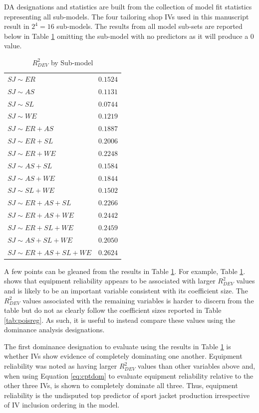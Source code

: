 \documentclass[ShortAfour,times,sageapa]{sagej}
\begin{document}
	DA designations and statistics are built from the collection of model fit statistics representing all sub-models.
	The four tailoring shop IVs used in this manuscript result in $2^4 = 16$ sub-models.
	The results from all model sub-sets are reported below in Table \ref{tab:r2sub} omitting the sub-model with no predictors as it will produce a 0 value.
	
	\begin{table}[h!]
		\centering
		\caption{\centering $R^2_{DEV}$ by Sub-model}
		\begin{tabular}{l|r}
			\toprule
			$SJ \sim ER$ & $0.1524$ \\ 
			$SJ \sim AS$ & $0.1131$ \\ 
			$SJ \sim SL$ & $0.0744$ \\ 
			$SJ \sim WE$ & $0.1219$ \\ 
			$SJ \sim ER + AS$ & $0.1887$ \\ 
			$SJ \sim ER + SL$ & $0.2006$ \\ 
			$SJ \sim ER + WE$ & $0.2248$ \\ 
			$SJ \sim AS + SL$ & $0.1584$ \\ 
			$SJ \sim AS + WE$ & $0.1844$ \\ 
			$SJ \sim SL + WE$ & $0.1502$ \\ 
			$SJ \sim ER + AS + SL$ & $0.2266$\\ 
			$SJ \sim ER + AS + WE$ & $0.2442$ \\ 
			$SJ \sim ER + SL + WE$ & $0.2459$ \\ 
			$SJ \sim AS + SL + WE$ & $0.2050$ \\ 
			$SJ \sim ER + AS + SL + WE$ & $0.2624$ \\ 
			\bottomrule
		\end{tabular}
		\label{tab:r2sub}
	\end{table} 

	A few points can be gleaned from the results in Table \ref{tab:r2sub}. 
	For example, Table \ref{tab:r2sub}. shows that equipment reliability appears to be associated with larger $R^2_{DEV}$ values and is likely to be an important variable consistent with its coefficient size. 
	The $R^2_{DEV}$ values associated with the remaining variables is harder to discern from the table but do not as clearly follow the coefficient sizes reported in Table \ref{tab:poisreg}.
	As such, it is useful to instead compare these values using the dominance analysis designations.
	
	The first dominance designation to evaluate using the results in Table \ref{tab:r2sub} is whether IVs show evidence of completely dominating one another.
	Equipment reliability was noted as having larger $R^2_{DEV}$ values than other variables above and, when using Equation \ref{eq:cptdom} to evaluate equipment reliability relative to the other three IVs, is shown to completely dominate all three.
	Thus, equipment reliability is the undisputed top predictor of sport jacket production irrespective of IV inclusion ordering in the model.	
	
\end{document}
